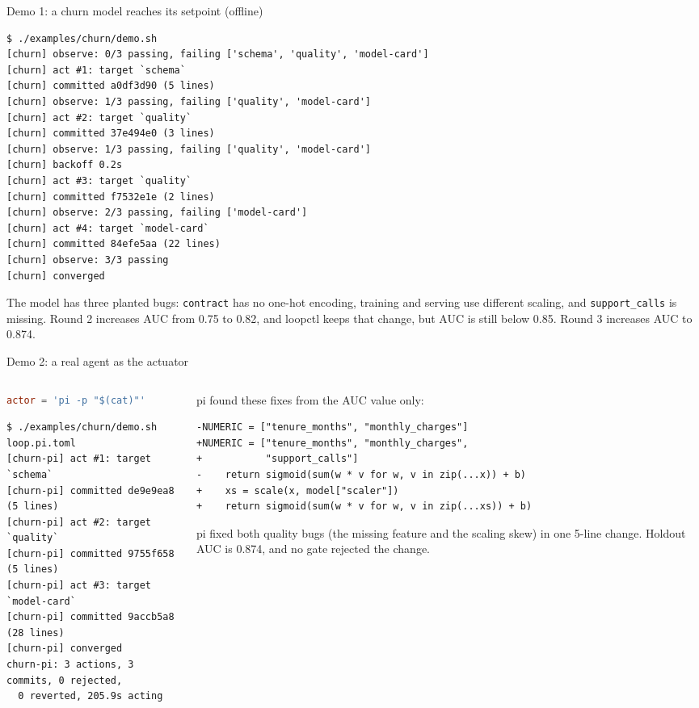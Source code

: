 \documentclass[aspectratio=169]{beamer}
\begin{document}
\begin{frame}[fragile]{Demo 1: a churn model reaches its setpoint (offline)}
\begin{lstlisting}[style=termsm]
$ ./examples/churn/demo.sh
[churn] observe: 0/3 passing, failing ['schema', 'quality', 'model-card']
[churn] act #1: target `schema`
[churn] committed a0df3d90 (5 lines)
[churn] observe: 1/3 passing, failing ['quality', 'model-card']
[churn] act #2: target `quality`
[churn] committed 37e494e0 (3 lines)
[churn] observe: 1/3 passing, failing ['quality', 'model-card']
[churn] backoff 0.2s
[churn] act #3: target `quality`
[churn] committed f7532e1e (2 lines)
[churn] observe: 2/3 passing, failing ['model-card']
[churn] act #4: target `model-card`
[churn] committed 84efe5aa (22 lines)
[churn] observe: 3/3 passing
[churn] converged
\end{lstlisting}
  \small The model has three planted bugs: \texttt{contract} has no one-hot encoding, training and serving use different scaling, and \texttt{support\_calls} is missing. Round 2 increases AUC from 0.75 to 0.82, and loopctl keeps that change, but AUC is still below 0.85. Round 3 increases AUC to 0.874.
\end{frame}

\begin{frame}[fragile]{Demo 2: a real agent as the actuator}
  \begin{columns}[T]
    \begin{column}{0.46\textwidth}
\begin{lstlisting}[language=toml]
actor = 'pi -p "$(cat)"'
\end{lstlisting}
\begin{lstlisting}[style=termsm]
$ ./examples/churn/demo.sh loop.pi.toml
[churn-pi] act #1: target `schema`
[churn-pi] committed de9e9ea8 (5 lines)
[churn-pi] act #2: target `quality`
[churn-pi] committed 9755f658 (5 lines)
[churn-pi] act #3: target `model-card`
[churn-pi] committed 9accb5a8 (28 lines)
[churn-pi] converged
churn-pi: 3 actions, 3 commits, 0 rejected,
  0 reverted, 205.9s acting
\end{lstlisting}
    \end{column}
    \begin{column}{0.5\textwidth}
      pi found these fixes from the AUC value only:
\begin{lstlisting}[style=termsm]
-NUMERIC = ["tenure_months", "monthly_charges"]
+NUMERIC = ["tenure_months", "monthly_charges",
+           "support_calls"]
-    return sigmoid(sum(w * v for w, v in zip(...x)) + b)
+    xs = scale(x, model["scaler"])
+    return sigmoid(sum(w * v for w, v in zip(...xs)) + b)
\end{lstlisting}
      \small pi fixed both quality bugs (the missing feature and the scaling skew) in one 5-line change. Holdout AUC is 0.874, and no gate rejected the change.
    \end{column}
  \end{columns}
\end{frame}
\end{document}
